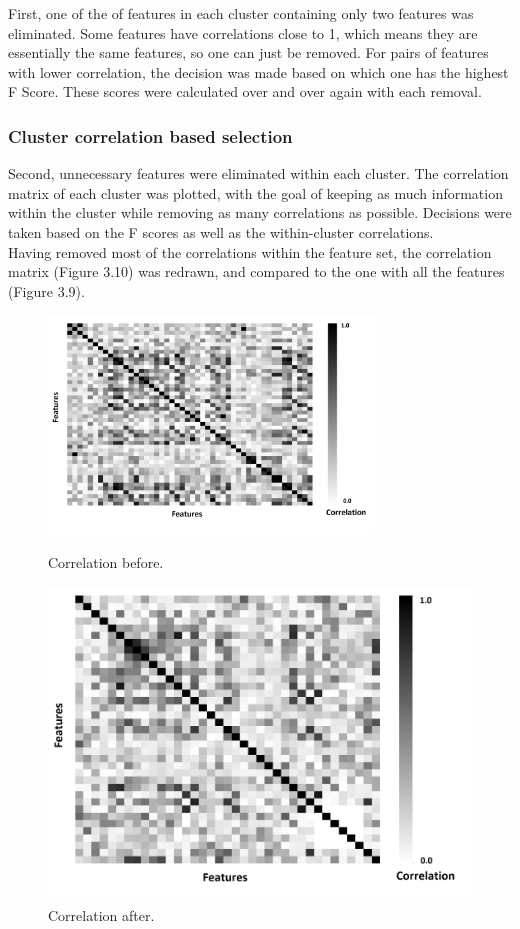 First, one of the of features in each cluster containing only two features was  eliminated. Some features have correlations close to 1, which means they are essentially the same features, so one can just be removed. For pairs of features with lower correlation, the decision was made based on which one has the highest F Score. These scores were calculated over and over again with each removal.
\subsubsection{Cluster correlation based selection}
Second, unnecessary features were eliminated within each cluster. The  correlation matrix of each cluster was plotted, with the goal of keeping as much information within the cluster while removing as many correlations as possible. Decisions were taken based on the F scores as well as the within-cluster correlations.\\

Having removed most of the correlations within the feature set, the correlation matrix (Figure 3.10) was redrawn, and compared to the one with all the features (Figure 3.9).
\begin{figure}[h!]
  \centering
  \begin{minipage}[b]{0.48\textwidth}
    \includegraphics[width=\textwidth, height=5.8cm]{Images/Results/Feature Analysis/feature correlation.png}
    \caption{Correlation before.}
  \end{minipage}
  \hfill
  \begin{minipage}[b]{0.48\textwidth}
    \includegraphics[width=\textwidth]{Images/Results/Feature Analysis/Pearson after.png}
    \caption{Correlation after.}
  \end{minipage}
\end{figure}


